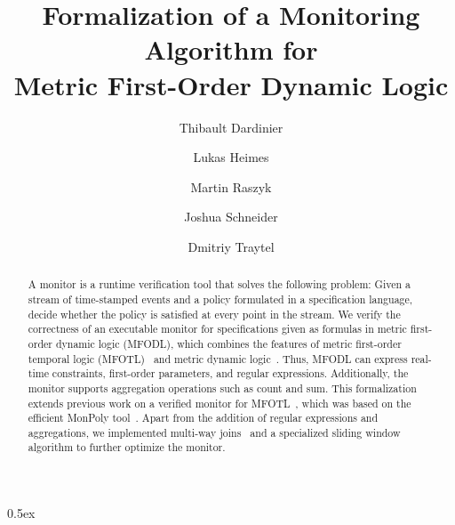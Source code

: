 \documentclass[10pt,a4paper]{article}
\begin{document}
\title{Formalization of a Monitoring Algorithm for\\ Metric First-Order Dynamic Logic}
\author{Thibault Dardinier \and Lukas Heimes \and Martin Raszyk \and Joshua Schneider \and Dmitriy Traytel}

\maketitle

\begin{abstract}
A monitor is a runtime verification tool that solves the following problem: Given a stream
of time-stamped events and a policy formulated in a specification language, decide
whether the policy is satisfied at every point in the stream. We verify the correctness
of an executable monitor for specifications given as formulas in metric first-order
dynamic logic (MFODL), which combines the features of metric first-order temporal logic
(MFOTL)~\cite{BasinKMZ-JACM15} and metric dynamic logic~\cite{BasinKT-RV17}. Thus, MFODL
can express real-time constraints, first-order parameters, and regular expressions.
Additionally, the monitor supports aggregation operations such as count and sum.
This formalization extends previous work on a verified monitor for
MFOTL~\cite{SchneiderBKT2019RV}, which was based on the efficient MonPoly
tool~\cite{monpoly}. Apart from the addition of regular expressions and aggregations, we
implemented multi-way joins~\cite{Dardinier2019AFP} and a specialized sliding window
algorithm to further optimize the monitor.
\end{abstract}

\tableofcontents

\parindent 0pt\parskip 0.5ex





\end{document}
